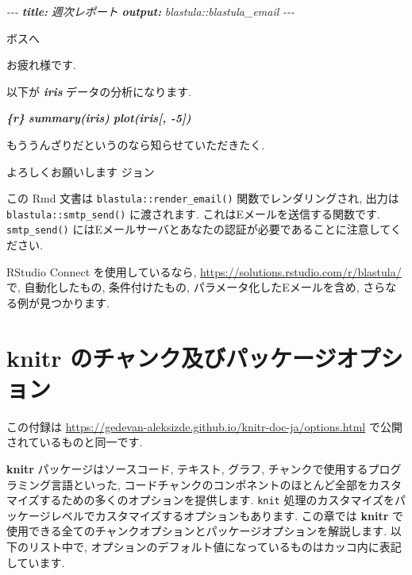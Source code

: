\documentclass[
  11pt,
  lualatex,ja=standard,jafont=noto]{bxjsreport}
\newenvironment{Shaded}{\begin{snugshade}}{\end{snugshade}}
\newcommand{\AnnotationTok}[1]{\textcolor[rgb]{0.56,0.35,0.01}{\textbf{\textit{#1}}}}
\newcommand{\CommentTok}[1]{\textcolor[rgb]{0.56,0.35,0.01}{\textit{#1}}}
\newcommand{\InformationTok}[1]{\textcolor[rgb]{0.56,0.35,0.01}{\textbf{\textit{#1}}}}
\newcommand{\NormalTok}[1]{#1}
\newenvironment{infobox}[1]{\begin{itemize}\renewcommand{\labelitemi}{\raisebox{-.7\height}[0pt][0pt]{%
  {\setkeys{Gin}{width=3em,keepaspectratio}\texttt{[image: \_latex/\_img/\#1]}}}}
  \setlength{\fboxsep}{1em}
  \begin{greyblock}
  \item
  }{\end{greyblock}\end{itemize}
}
\begin{document}
\begin{Shaded}
\begin{Highlighting}[]
\CommentTok{{-}{-}{-}}
\AnnotationTok{title:}\CommentTok{ 週次レポート}
\AnnotationTok{output:}\CommentTok{ blastula::blastula\_email}
\CommentTok{{-}{-}{-}} 

\NormalTok{ボスへ}

\NormalTok{お疲れ様です.}

\NormalTok{以下が }\InformationTok{\textasciigrave{}iris\textasciigrave{}}\NormalTok{ データの分析になります.}

\InformationTok{\textasciigrave{}\textasciigrave{}\textasciigrave{}\{r\}}
\InformationTok{summary(iris)}
\InformationTok{plot(iris[, {-}5])}
\InformationTok{\textasciigrave{}\textasciigrave{}\textasciigrave{}}

\NormalTok{もううんざりだというのなら知らせていただきたく.}

\NormalTok{よろしくお願いします}
\NormalTok{ジョン}
\end{Highlighting}
\end{Shaded}

この Rmd 文書は \texttt{blastula::render\_email()} 関数でレンダリングされ, 出力は \texttt{blastula::smtp\_send()} に渡されます. これはEメールを送信する関数です. \texttt{smtp\_send()} にはEメールサーバとあなたの認証が必要であることに注意してください.

RStudio Connect を使用しているなら, \url{https://solutions.rstudio.com/r/blastula/} で, 自動化したもの, 条件付けたもの, パラメータ化したEメールを含め, さらなる例が見つかります.

\hypertarget{appendix-ux88dcux907a}{%
\appendix}


\hypertarget{full-options}{%
\chapter{\texorpdfstring{\textbf{knitr} のチャンク及びパッケージオプション}{knitr のチャンク及びパッケージオプション}}\label{full-options}}

\begin{infobox}{tip}
この付録は \url{https://gedevan-aleksizde.github.io/knitr-doc-ja/options.html} で公開されているものと同一です.

\end{infobox}

\textbf{knitr} パッケージはソースコード, テキスト, グラフ, チャンクで使用するプログラミング言語といった, コードチャンクのコンポネントのほとんど全部をカスタマイズするための多くのオプションを提供します. \texttt{knit} 処理のカスタマイズをパッケージレベルでカスタマイズするオプションもあります. この章では \textbf{knitr} で使用できる全てのチャンクオプションとパッケージオプションを解説します. 以下のリスト中で, オプションのデフォルト値になっているものはカッコ内に表記しています.
\end{document}
